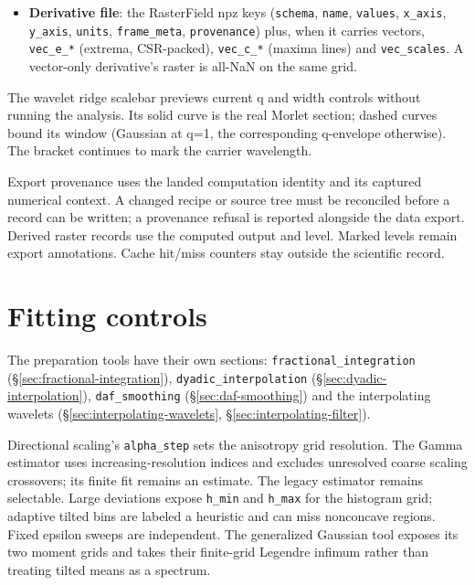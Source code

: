 \documentclass[10pt]{article}
\newcommand{\dev}[1]{\texttt{#1}}
\begin{document}
\begin{itemize}
        \texttt{\_heldout\_mask}, \texttt{\_hists} (the per-level $\ln|\eta|$ and $\ln|c|$
        histograms), \texttt{\_abacus}, \texttt{\_warnings}, \texttt{\_filled\_fraction};
        \dev{dwt2d} --- \texttt{scales} ($2^j$ px), \texttt{\_dwt\_levels}. A \dev{fill} clone's
        provenance carries \texttt{fill}; an analyzer result after it carries \texttt{\_fill}.
  \item \textbf{Derivative file}: the RasterField npz keys (\texttt{schema}, \texttt{name},
        \texttt{values}, \texttt{x\_axis}, \texttt{y\_axis}, \texttt{units},
        \texttt{frame\_meta}, \texttt{provenance}) plus, when it carries vectors,
        \texttt{vec\_e\_*} (extrema, CSR-packed), \texttt{vec\_c\_*} (maxima lines) and
        \texttt{vec\_scales}. A vector-only derivative's raster is all-NaN on the same grid.
\end{itemize}


The wavelet ridge scalebar previews current q and width controls without running
the analysis. Its solid curve is the real Morlet section; dashed curves bound its
window (Gaussian at q=1, the corresponding q-envelope otherwise). The bracket
continues to mark the carrier wavelength.

Export provenance uses the landed computation identity and its captured numerical
context. A changed recipe or source tree must be reconciled before a record can be
written; a provenance refusal is reported alongside the data export. Derived raster
records use the computed output and level. Marked levels remain export annotations.
Cache hit/miss counters stay outside the scientific record.

\section{Fitting controls}
The preparation tools have their own sections: \dev{fractional\_integration}
(\S\ref{sec:fractional-integration}), \dev{dyadic\_interpolation}
(\S\ref{sec:dyadic-interpolation}), \dev{daf\_smoothing} (\S\ref{sec:daf-smoothing}) and the
interpolating wavelets (\S\ref{sec:interpolating-wavelets}, \S\ref{sec:interpolating-filter}).

Directional scaling's \texttt{alpha\_step} sets the anisotropy grid resolution.
The Gamma estimator uses increasing-resolution indices and excludes unresolved
coarse scaling crossovers; its finite fit remains an estimate. The legacy
estimator remains selectable. Large deviations expose \texttt{h\_min} and
\texttt{h\_max} for the histogram grid; adaptive tilted bins are labeled a
heuristic and can miss nonconcave regions. Fixed epsilon sweeps are independent.
The generalized Gaussian tool exposes its two moment grids and takes their
finite-grid Legendre infimum rather than treating tilted means as a spectrum.
\end{document}
